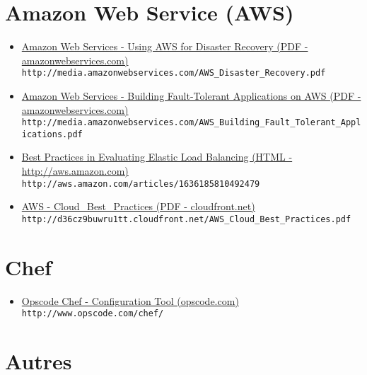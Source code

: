 \section{Amazon Web Service (AWS)}
\begin{itemize}         
\item \href{http://media.amazonwebservices.com/AWS_Disaster_Recovery.pdf}{Amazon
Web Services - Using AWS for Disaster Recovery (PDF - amazonwebservices.com)}\\
\verb?http://media.amazonwebservices.com/AWS_Disaster_Recovery.pdf?

\item \href{http://media.amazonwebservices.com/AWS_Building_Fault_Tolerant_Applications.pdf}{Amazon
Web Services - Building Fault-Tolerant Applications on AWS (PDF - amazonwebservices.com)}\\
\verb?http://media.amazonwebservices.com/AWS_Building_Fault_Tolerant_Applications.pdf?

\item \href{http://aws.amazon.com/articles/1636185810492479}{Best Practices in
Evaluating Elastic Load Balancing (HTML - http://aws.amazon.com)}\\
\verb?http://aws.amazon.com/articles/1636185810492479?

\item \href{http://d36cz9buwru1tt.cloudfront.net/AWS_Cloud_Best_Practices.pdf}{AWS
- Cloud\_Best\_Practices (PDF - cloudfront.net)}\\
\verb?http://d36cz9buwru1tt.cloudfront.net/AWS_Cloud_Best_Practices.pdf?
\end{itemize}         

\section{Chef}
\begin{itemize}
\item \href{http://www.opscode.com/chef/}{Opscode Chef - Configuration Tool (opscode.com)}\\
\verb?http://www.opscode.com/chef/?
\end{itemize}         

\section{Autres}

